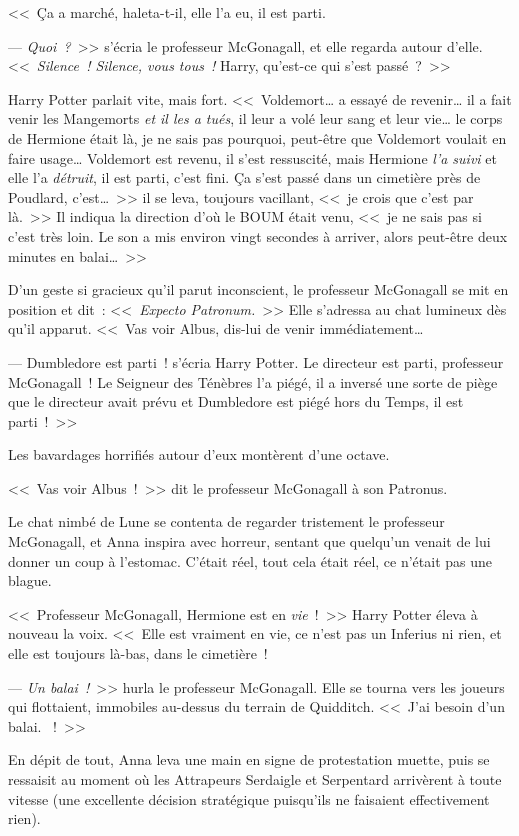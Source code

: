 <<~Ça a marché, haleta-t-il, elle l'a eu, il est parti.

--- \emph{Quoi~?}~>> s'écria le professeur McGonagall, et elle regarda autour d'elle. <<~\emph{Silence~! Silence, vous tous~!} Harry, qu'est-ce qui s'est passé~?~>>

Harry Potter parlait vite, mais fort. <<~Voldemort… a essayé de revenir… il a fait venir les Mangemorts \emph{et il les a tués}, il leur a volé leur sang et leur vie… le corps de Hermione était là, je ne sais pas pourquoi, peut-être que Voldemort voulait en faire usage… Voldemort est revenu, il s'est ressuscité, mais Hermione \emph{l'a suivi} et elle l'a \emph{détruit}, il est parti, c'est fini. Ça s'est passé dans un cimetière près de Poudlard, c'est…~>> il se leva, toujours vacillant, <<~je crois que c'est par là.~>> Il indiqua la direction d'où le BOUM était venu, <<~je ne sais pas si c'est très loin. Le son a mis environ vingt secondes à arriver, alors peut-être deux minutes en balai…~>>

D'un geste si gracieux qu'il parut inconscient, le professeur McGonagall se mit en position et dit~: <<~\emph{Expecto Patronum.}~>> Elle s'adressa au chat lumineux dès qu'il apparut. <<~Vas voir Albus, dis-lui de venir immédiatement…

--- Dumbledore est parti~! s'écria Harry Potter. Le directeur est parti, professeur McGonagall~! Le Seigneur des Ténèbres l'a piégé, il a inversé une sorte de piège que le directeur avait prévu et Dumbledore est piégé hors du Temps, il est parti~!~>>

Les bavardages horrifiés autour d'eux montèrent d'une octave.

<<~Vas voir Albus~!~>> dit le professeur McGonagall à son Patronus.

Le chat nimbé de Lune se contenta de regarder tristement le professeur McGonagall, et Anna inspira avec horreur, sentant que quelqu'un venait de lui donner un coup à l'estomac. C'était réel, tout cela était réel, ce n'était pas une blague.

<<~Professeur McGonagall, Hermione est en \emph{vie}~!~>> Harry Potter éleva à nouveau la voix. <<~Elle est vraiment en vie, ce n'est pas un Inferius ni rien, et elle est toujours là-bas, dans le cimetière~!

--- \emph{Un balai~!}~>> hurla le professeur McGonagall. Elle se tourna vers les joueurs qui flottaient, immobiles au-dessus du terrain de Quidditch. <<~J'ai besoin d'un balai. ~!~>>

En dépit de tout, Anna leva une main en signe de protestation muette, puis se ressaisit au moment où les Attrapeurs Serdaigle et Serpentard arrivèrent à toute vitesse (une excellente décision stratégique puisqu'ils ne faisaient effectivement rien).

